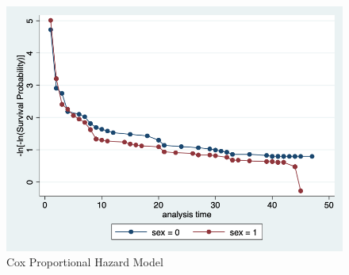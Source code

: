 \documentclass[12pt]{article}
\begin{document}
\begin{figure}[!h]
	\centering
	\centering
	\caption{Cox Proportional Hazard Model}
	\label{fig:cox}
	\includegraphics[scale=0.5]{cph.png}
\end{figure}
\end{document}
